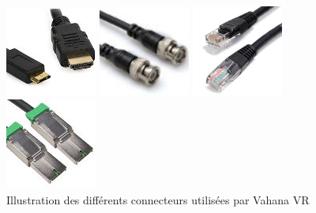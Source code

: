 \begin{figure}
  \centering
  \begin{minipage}{0.2\textwidth}
    \centering
    \includegraphics[width=3cm]{images/hdmi-cable.jpg}
  \end{minipage}%
  \hspace{0.03\textwidth}
  \begin{minipage}{0.2\textwidth}
    \centering
    \includegraphics[width=3cm]{images/sdi-cable.jpg}
  \end{minipage}%
  \hspace{0.03\textwidth}
  \begin{minipage}{0.2\textwidth}
    \centering
    \includegraphics[width=3cm]{images/ethernet-cable.jpg}
  \end{minipage}%
  \hspace{0.03\textwidth}
  \begin{minipage}{0.2\textwidth}
    \centering
    \includegraphics[width=3cm]{images/pcie-cable.jpg}
  \end{minipage}
  \caption{Illustration des différents connecteurs utilisées par Vahana VR}
\end{figure}


